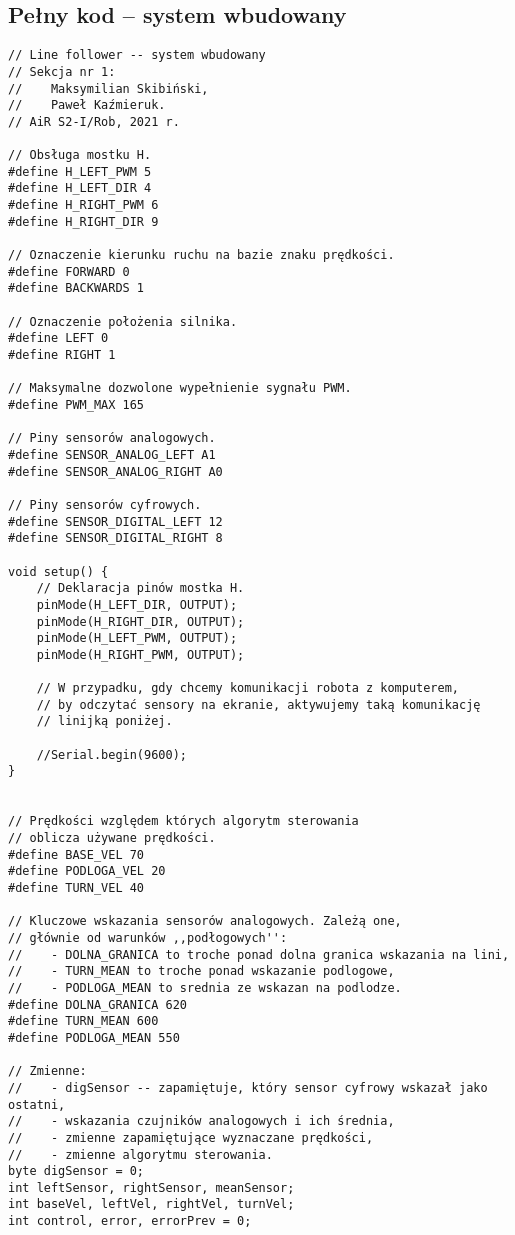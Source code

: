 \documentclass[11pt]{article}
\begin{document}
\begin{appendices}
\section{Pełny kod -- system wbudowany \label{sec:kodEmb}}


\linespread{1.0}

\begin{lstlisting}[basicstyle = \ttfamily \footnotesize]
// Line follower -- system wbudowany
// Sekcja nr 1:
//    Maksymilian Skibiński,
//    Paweł Kaźmieruk.
// AiR S2-I/Rob, 2021 r.

// Obsługa mostku H.
#define H_LEFT_PWM 5
#define H_LEFT_DIR 4
#define H_RIGHT_PWM 6
#define H_RIGHT_DIR 9

// Oznaczenie kierunku ruchu na bazie znaku prędkości.
#define FORWARD 0
#define BACKWARDS 1

// Oznaczenie położenia silnika.
#define LEFT 0
#define RIGHT 1

// Maksymalne dozwolone wypełnienie sygnału PWM.
#define PWM_MAX 165

// Piny sensorów analogowych.
#define SENSOR_ANALOG_LEFT A1
#define SENSOR_ANALOG_RIGHT A0

// Piny sensorów cyfrowych.
#define SENSOR_DIGITAL_LEFT 12
#define SENSOR_DIGITAL_RIGHT 8

void setup() {
    // Deklaracja pinów mostka H.
    pinMode(H_LEFT_DIR, OUTPUT);
    pinMode(H_RIGHT_DIR, OUTPUT);
    pinMode(H_LEFT_PWM, OUTPUT);
    pinMode(H_RIGHT_PWM, OUTPUT);

    // W przypadku, gdy chcemy komunikacji robota z komputerem,
    // by odczytać sensory na ekranie, aktywujemy taką komunikację
    // linijką poniżej.
    
    //Serial.begin(9600);
}


// Prędkości względem których algorytm sterowania
// oblicza używane prędkości.
#define BASE_VEL 70
#define PODLOGA_VEL 20
#define TURN_VEL 40

// Kluczowe wskazania sensorów analogowych. Zależą one,
// głównie od warunków ,,podłogowych'':
//    - DOLNA_GRANICA to troche ponad dolna granica wskazania na lini,
//    - TURN_MEAN to troche ponad wskazanie podlogowe,
//    - PODLOGA_MEAN to srednia ze wskazan na podlodze.
#define DOLNA_GRANICA 620
#define TURN_MEAN 600
#define PODLOGA_MEAN 550

// Zmienne:
//    - digSensor -- zapamiętuje, który sensor cyfrowy wskazał jako ostatni,
//    - wskazania czujników analogowych i ich średnia,
//    - zmienne zapamiętujące wyznaczane prędkości,
//    - zmienne algorytmu sterowania.
byte digSensor = 0;
int leftSensor, rightSensor, meanSensor;
int baseVel, leftVel, rightVel, turnVel;
int control, error, errorPrev = 0;


\end{lstlisting}
\end{appendices}
\end{document}
